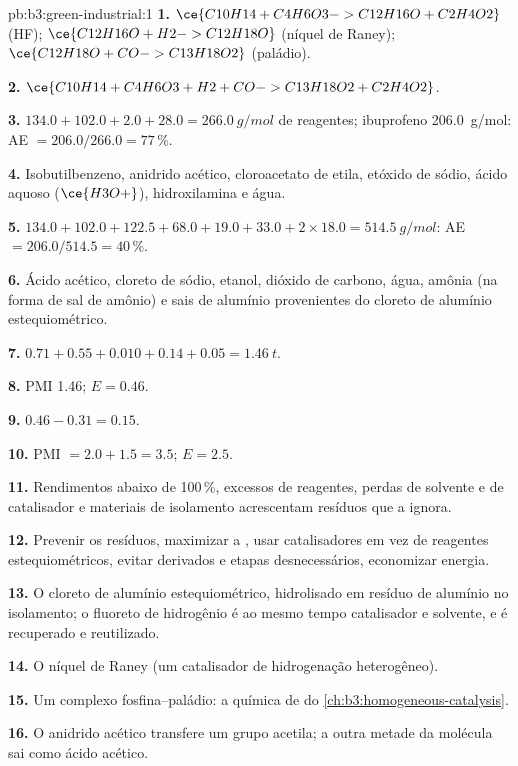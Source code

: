 \begin{solution}{pb:b3:green-industrial:1}
\textbf{1.} $\ce{C10H14 + C4H6O3 -> C12H16O + C2H4O2}$ (HF); $\ce{C12H16O + H2 -> C12H18O}$ (níquel de Raney);
$\ce{C12H18O + CO -> C13H18O2}$ (paládio).

\textbf{2.} $\ce{C10H14 + C4H6O3 + H2 + CO -> C13H18O2 + C2H4O2}$.

\textbf{3.} $134.0 + 102.0 + 2.0 + 28.0 = \qty{266.0}{g/mol}$ de reagentes; ibuprofeno \qty{206.0}{g/mol}: AE $= 206.0/266.0 = 77$\,\%.

\textbf{4.} Isobutilbenzeno, anidrido acético, cloroacetato de etila, etóxido de sódio,
ácido aquoso ($\ce{H3O+}$), hidroxilamina e água.

\textbf{5.} $134.0 + 102.0 + 122.5 + 68.0 + 19.0 + 33.0 + 2 \times 18.0 = \qty{514.5}{g/mol}$: AE $= 206.0/514.5 = 40$\,\%.

\textbf{6.} Ácido acético, cloreto de sódio, etanol, dióxido de carbono, água, amônia (na forma de
sal de amônio) e sais de alumínio provenientes do cloreto de alumínio estequiométrico.

\textbf{7.} $0.71 + 0.55 + 0.010 + 0.14 + 0.05 = \qty{1.46}{t}$.

\textbf{8.} PMI 1.46; $E = 0.46$.

\textbf{9.} $0.46 - 0.31 = 0.15$.

\textbf{10.} PMI $= 2.0 + 1.5 = 3.5$; $E = 2.5$.

\textbf{11.} Rendimentos abaixo de 100\,\%, excessos de reagentes, perdas de solvente e de catalisador e
materiais de isolamento acrescentam resíduos que a  ignora.

\textbf{12.} Prevenir os resíduos, maximizar a , usar catalisadores em vez de
reagentes estequiométricos, evitar derivados e etapas desnecessários, economizar energia.

\textbf{13.} O cloreto de alumínio estequiométrico, hidrolisado em resíduo de alumínio no
isolamento; o fluoreto de hidrogênio é ao mesmo tempo catalisador e solvente, e é recuperado e reutilizado.

\textbf{14.} O níquel de Raney (um catalisador de hidrogenação heterogêneo).

\textbf{15.} Um complexo fosfina--paládio: a química de  do
\cref{ch:b3:homogeneous-catalysis}.

\textbf{16.} O anidrido acético transfere um grupo acetila; a outra metade da
molécula sai como ácido acético.


\end{solution}
